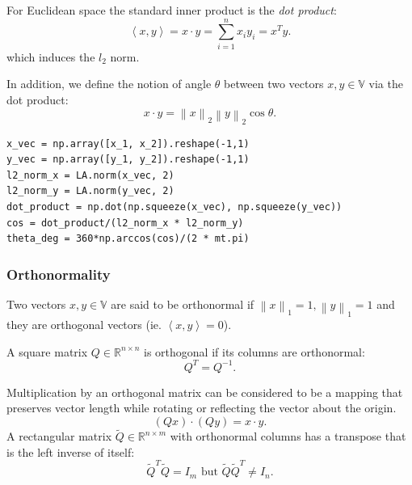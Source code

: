 \begin{example}
  For Euclidean space the standard inner product is the \emph{dot product}:
  \[\left<x,y \right> =x\cdot y=\sum_{i=1}^{n} x_{i}y_{i}=x^{T}y.\]
  which induces the $l_2$ norm.
\end{example}
In addition, we define the notion of angle $\theta$ between two vectors $x,y\in
\mathbb{V}$ via the dot product:
\[x\cdot y=\left \lVert x \right \rVert_2 \left \lVert y \right \rVert_2 \cos{\theta}.\] 
\begin{lstlisting}
x_vec = np.array([x_1, x_2]).reshape(-1,1)
y_vec = np.array([y_1, y_2]).reshape(-1,1)
l2_norm_x = LA.norm(x_vec, 2)
l2_norm_y = LA.norm(y_vec, 2)
dot_product = np.dot(np.squeeze(x_vec), np.squeeze(y_vec))
cos = dot_product/(l2_norm_x * l2_norm_y)
theta_deg = 360*np.arccos(cos)/(2 * mt.pi)
\end{lstlisting}
\subsubsection{Orthonormality}
\begin{definition}[Orthonormal]
  Two vectors $x, y \in \mathbb{V}$ are said to be orthonormal if $\left \lVert
  x \right \rVert_1 =1,\left \lVert y \right \rVert_1 =1$ and they are
  orthogonal vectors (ie. $\left<x,y \right> =0$).
\end{definition}
\begin{definition}
  A square matrix $Q\in \mathbb{R}^{n\times n}$ is orthogonal if its columns
  are orthonormal:
  \[Q^{T}=Q^{-1}.\] 
\end{definition}
Multiplication by an orthogonal matrix can be considered to be a mapping that
preserves vector length while rotating or reflecting the vector about the
origin.\\
\[(Qx)\cdot(Qy)=x\cdot y.\] 
A rectangular matrix $\tilde{Q}\in \mathbb{R}^{n\times m}$ with orthonormal
columns has a transpose that is the left inverse of itself:
\[{\tilde{Q}}^{T}\tilde{Q}=I_m\text{  but  } \tilde{Q}{\tilde{Q}}^{T}\neq I_{n}.\] 
